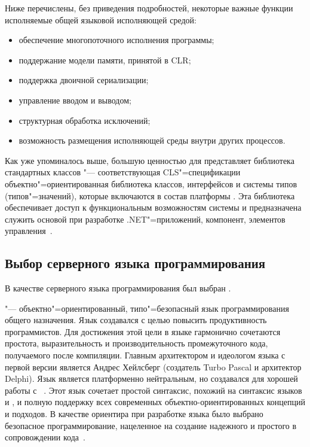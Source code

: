 Ниже перечислены, без приведения подробностей, некоторые важные функции исполняемые общей языковой исполняющей средой:
\begin{itemize}
  \item обеспечение многопоточного исполнения программы;
  \item поддержание модели памяти, принятой в CLR;
  \item поддержка двоичной сериализации;
  \item управление вводом и выводом;
  \item структурная обработка исключений;
  \item возможность размещения исполняющей среды внутри других процессов.
\end{itemize}

Как уже упоминалось выше, большую ценностью для \dotnet{} представляет библиотека стандартных классов "--- соответствующая CLS"=спецификации объектно"=ориентированная библиотека классов, интерфейсов и системы типов (типов"=значений), которые включаются в состав платформы \dotnet{}.
Эта библиотека обеспечивает доступ к функциональным возможностям системы и предназначена служить основой при разработке .NET"=приложений, компонент, элементов управления~\cite{marchenko_2007}.





\subsection{Выбор серверного языка программирования }
\label{sub:practice:serverlang}

В качестве серверного языка программирования был выбран \csharp{}.

\csharp{} "--- объектно"=ориентированный, типо"=безопасный язык программирования общего назначения.
Язык создавался с целью повысить продуктивность программистов.
Для достижения этой цели в языке гармонично сочетаются простота, выразительность и производительность промежуточного кода, получаемого после компиляции.
Главным архитектором и идеологом языка с первой версии является Андрес Хейлсберг (создатель Turbo Pascal и архитектор Delphi).
Язык \csharp{} является платформенно нейтральным, но создавался для хорошей работы с \dotnet{}~\cite{albahari_2012_en}.
Этот язык сочетает простой синтаксис, похожий на синтаксис языков \cpp{} и \java{}, и полную поддержку всех современных объектно-ориентированных концепций и подходов. В качестве ориентира при разработке языка было выбрано безопасное программирование, нацеленное на создание надежного и простого в сопровождении кода~\cite{volosevich_cs_2011}.

